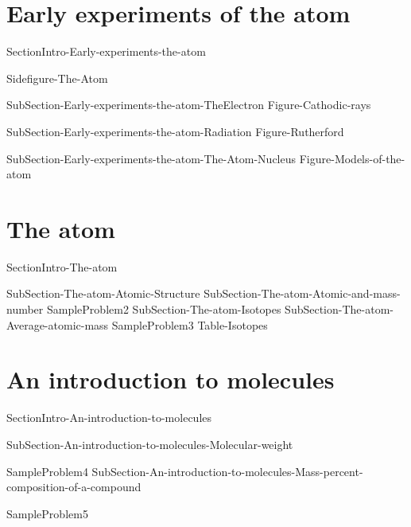 \documentclass[main.tex]{subfiles}
\newcommand\chapterlabel{Ch-Table}\setcounter{figurenewcounter}{0}\setcounter{tablenewcounter}{0}\setcounter{formulanewcounter}{0}
\begin{document}
 \section{Early experiments of the atom}
{SectionIntro-Early-experiments-the-atom}
 \sloppy\begin{description}
  {Sidefigure-The-Atom}
\item[\docfilehook{Charge to mass ratio of an electron}{}] {SubSection-Early-experiments-the-atom-TheElectron}
   {Figure-Cathodic-rays}

\item[\docfilehook{Radiation}{}] {SubSection-Early-experiments-the-atom-Radiation}
  {Figure-Rutherford}
\item[\docfilehook{The atom nucleus}{}] {SubSection-Early-experiments-the-atom-The-Atom-Nucleus}
 {Figure-Models-of-the-atom}



  \end{description}
 
\section{The atom}
{SectionIntro-The-atom}
\sloppy\begin{description}
{SubSection-The-atom-Atomic-Structure}
{SubSection-The-atom-Atomic-and-mass-number}
{SampleProblem2}
{SubSection-The-atom-Isotopes}
{SubSection-The-atom-Average-atomic-mass}
{SampleProblem3}
 {Table-Isotopes}
\end{description}
\section{An introduction to molecules}
{SectionIntro-An-introduction-to-molecules}
\sloppy
\begin{description}
{SubSection-An-introduction-to-molecules-Molecular-weight}
 
{SampleProblem4}
{SubSection-An-introduction-to-molecules-Mass-percent-composition-of-a-compound}
 
{SampleProblem5}
\end{description}
\end{document}
